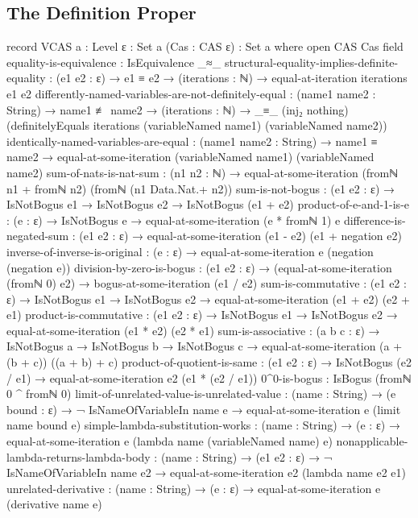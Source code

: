 \documentclass{report}
\begin{document}
\subsection{The Definition Proper}

\begin{code}
record VCAS {a : Level} {ε : Set a} (Cas : CAS ε) : Set a where
  open CAS Cas
  field
    equality-is-equivalence : IsEquivalence _≈_
    structural-equality-implies-definite-equality :
      (e1 e2 : ε) →
      e1 ≡ e2 →
      (iterations : ℕ) →
      equal-at-iteration iterations e1 e2
    differently-named-variables-are-not-definitely-equal :
      (name1 name2 : String) →
      name1 ≢ name2 →
      (iterations : ℕ) →
      _≡_ (inj₂ nothing)
          (definitelyEquals iterations
                            (variableNamed name1)
                            (variableNamed name2))
    identically-named-variables-are-equal :
      (name1 name2 : String) →
      name1 ≡ name2 →
      equal-at-some-iteration (variableNamed name1) (variableNamed name2)
    sum-of-nats-is-nat-sum :
      (n1 n2 : ℕ) →
      equal-at-some-iteration (fromℕ n1 + fromℕ n2) (fromℕ (n1 Data.Nat.+ n2))
    sum-is-not-bogus :
      (e1 e2 : ε) →
      IsNotBogus e1 →
      IsNotBogus e2 →
      IsNotBogus (e1 + e2)
    product-of-e-and-1-is-e :
      (e : ε) →
      IsNotBogus e →
      equal-at-some-iteration (e * fromℕ 1) e
    difference-is-negated-sum :
      (e1 e2 : ε) →
      equal-at-some-iteration (e1 - e2)
                              (e1 + negation e2)
    inverse-of-inverse-is-original :
      (e : ε) →
      equal-at-some-iteration e (negation (negation e))
    division-by-zero-is-bogus :
      (e1 e2 : ε) →
      (equal-at-some-iteration (fromℕ 0) e2) →
      bogus-at-some-iteration (e1 / e2)
    sum-is-commutative :
      (e1 e2 : ε) →
      IsNotBogus e1 →
      IsNotBogus e2 →
      equal-at-some-iteration (e1 + e2) (e2 + e1)
    product-is-commutative :
      (e1 e2 : ε) →
      IsNotBogus e1 →
      IsNotBogus e2 →
      equal-at-some-iteration (e1 * e2) (e2 * e1)
    sum-is-associative :
      (a b c : ε) →
      IsNotBogus a →
      IsNotBogus b →
      IsNotBogus c →
      equal-at-some-iteration (a + (b + c)) ((a + b) + c)
    product-of-quotient-is-same :
      (e1 e2 : ε) →
      IsNotBogus (e2 / e1) →
      equal-at-some-iteration e2 (e1 * (e2 / e1))
    0^0-is-bogus : IsBogus (fromℕ 0 ^ fromℕ 0)
    limit-of-unrelated-value-is-unrelated-value :
      (name : String) →
      (e bound : ε) →
      ¬ IsNameOfVariableIn name e →
      equal-at-some-iteration e (limit name bound e)
    simple-lambda-substitution-works :
      (name : String) →
      (e : ε) →
      equal-at-some-iteration e (lambda name (variableNamed name) e)
    nonapplicable-lambda-returns-lambda-body :
      (name : String) →
      (e1 e2 : ε) →
      ¬ IsNameOfVariableIn name e2 →
      equal-at-some-iteration e2 (lambda name e2 e1)
    unrelated-derivative :
      (name : String) →
      (e : ε) →
      equal-at-some-iteration e (derivative name e)
\end{code}
\end{document}
